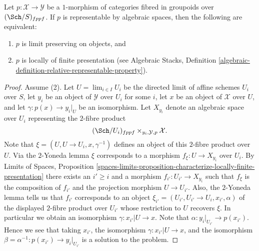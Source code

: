 \begin{lemma}
\label{lemma-representable-by-spaces-limit-preserving}
Let $p : \mathcal{X} \to \mathcal{Y}$ be a $1$-morphism of categories
fibred in groupoids over $(\Sch/S)_{fppf}$. If $p$ is
representable by algebraic spaces, then the following are equivalent:
\begin{enumerate}
\item $p$ is limit preserving on objects, and
\item $p$ is locally of finite presentation (see
Algebraic Stacks,
Definition \ref{algebraic-definition-relative-representable-property}).
\end{enumerate}
\end{lemma}

\begin{proof}
Assume (2). Let $U = \lim_{i \in I} U_i$ be the directed limit
of affine schemes $U_i$ over $S$, let $y_i$ be an object of $\mathcal{Y}$
over $U_i$ for some $i$, let $x$ be an object of $\mathcal{X}$ over $U$,
and let $\gamma : p(x) \to y_i|_U$ be an isomorphism. Let
$X_{y_i}$ denote an algebraic space over $U_i$ representing the $2$-fibre
product
$$
(\Sch/U_i)_{fppf} \times_{y_i, \mathcal{Y}, p} \mathcal{X}.
$$
Note that $\xi = (U, U \to U_i, x, \gamma^{-1})$ defines an object of
this $2$-fibre product over $U$. Via the $2$-Yoneda lemma $\xi$ corresponds
to a morphism $f_\xi : U \to X_{y_i}$ over $U_i$. By
Limits of Spaces, Proposition
\ref{spaces-limits-proposition-characterize-locally-finite-presentation}
there exists an $i' \geq i$ and a morphism $f_{i'} : U_{i'} \to X_{y_i}$
such that $f_\xi$ is the composition of $f_{i'}$ and the projection
morphism $U \to U_{i'}$. Also, the $2$-Yoneda lemma tells us that
$f_{i'}$ corresponds to an object
$\xi_{i'} = (U_{i'}, U_{i'} \to U_i, x_{i'}, \alpha)$ of
the displayed $2$-fibre product over $U_{i'}$ whose restriction to
$U$ recovers $\xi$. In particular we obtain an isomorphism
$\gamma : x_{i'}|U \to x$. Note that $\alpha : y_i|_{U_{i'}} \to p(x_{i'})$.
Hence we see that taking $x_{i'}$, the isomorphism
$\gamma : x_{i'}|U \to x$, and the isomorphism
$\beta = \alpha^{-1} : p(x_{i'}) \to y_i|_{U_{i'}}$
is a solution to the problem.


\end{proof}
